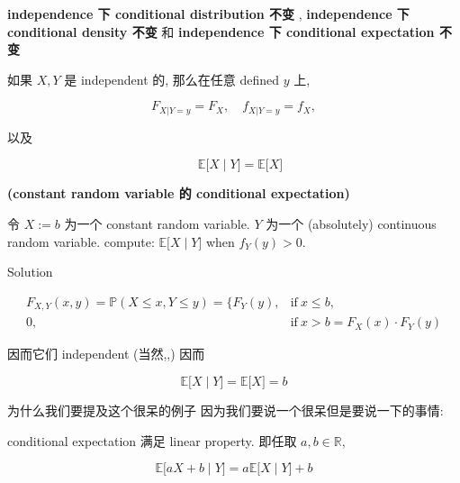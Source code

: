 \documentclass{qlnotes-export}
\begin{document}
\begin{proposition}{\protect{}\label{kn-independence-conditional-distribution-density-expectation}{\textbf{independence
下 conditional distribution 不变}} ,
\protect{}\label{kn-independence-conditional-density}{\textbf{independence
下 conditional density 不变}} 和
\protect{}\label{kn-independence-conditional-expectation}{\textbf{independence
下 conditional expectation 不变}}}

如果 \(X,Y\) 是 independent 的, 那么在任意 defined \(y\) 上,

\[F_{X|Y = y} = F_{X},\quad f_{X|Y = y} = f_{X},\]

以及

\[\left. \quad{\mathbb{E}}\lbrack X \middle| Y\rbrack = {\mathbb{E}}\lbrack X\rbrack \right.\]

\end{proposition}

\begin{example}

\textbf{(constant random variable 的 conditional expectation)}

令 \(X := b\) 为一个 constant random variable. \(Y\) 为一个 (absolutely) continuous random variable. compute: \(\left. {\mathbb{E}}\lbrack X \middle| Y\rbrack \right.\) when \(f_{Y}(y) > 0\).

\end{example}

\begin{qlsolution}{Solution}

\[\begin{matrix}
{F_{X,Y}(x,y) = {\mathbb{P}}(X \leq x,Y \leq y) = \{ F_{Y}(y),} & {\text{if}\ x \leq b,} \\
{0,} & {\text{if}\ x > b = F_{X}(x) \cdot F_{Y}(y)}
\end{matrix}\]

因而它们 independent (当然,,) 因而

\[\left. {\mathbb{E}}\lbrack X \middle| Y\rbrack = {\mathbb{E}}\lbrack X\rbrack = b \right.\]

\end{qlsolution}

为什么我们要提及这个很呆的例子 因为我们要说一个很呆但是要说一下的事情:

\begin{proposition}

conditional expectation 满足 linear property. 即任取 \(a,b \in {\mathbb{R}}\),

\[\left. {\mathbb{E}}\lbrack aX + b \middle| Y\rbrack = a{\mathbb{E}}\lbrack X \middle| Y\rbrack + b \right.\]

\end{proposition}
\end{document}
